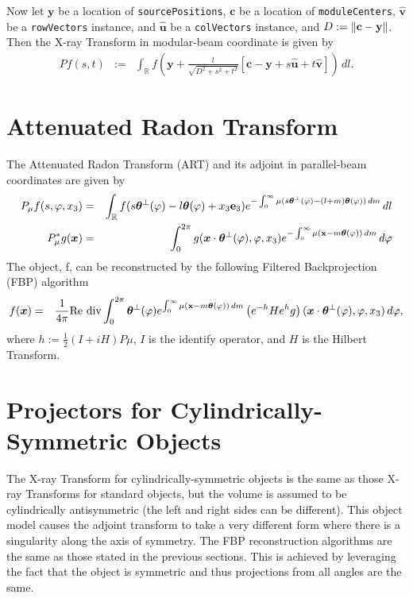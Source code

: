 \documentclass[11pt]{article}
\begin{document}
Now let $\bm{y}$ be a location of \texttt{sourcePositions}, $\bm{c}$ be a location of \texttt{moduleCenters}, $\bm{\widehat{v}}$ be a \texttt{rowVectors} instance, and $\bm{\widehat{u}}$ be a \texttt{colVectors} instance, and $D := \|\textbf{c}-\textbf{y}\|$. Then the X-ray Transform in modular-beam coordinate is given by
\begin{eqnarray*}
Pf(s,t) &:=& \int_{\mathbb{R}} f\left( \bm{y} + \frac{l}{\sqrt{D^2 + s^2 + t^2}}\left[ \bm{c}-\bm{y} + s\bm{\widehat{u}} + t\bm{\widehat{v}} \right] \right) \, dl.
\end{eqnarray*}


\section{Attenuated Radon Transform} \label{sec:ART}

The Attenuated Radon Transform (ART) and its adjoint in parallel-beam coordinates are given by
\begin{eqnarray*}
P_{\mu}f(s, \varphi, x_3) &=& \int_\mathbb{R} f(s\bm{\theta}^\perp(\varphi) - l\bm{\theta}(\varphi) + x_3\textbf{e}_3) e^{-\int_0^\infty \mu(s\bm{\theta}^\perp(\varphi) - (l+m)\bm{\theta}(\varphi)) \, dm} \, dl \\
P_{\mu}^*g(\bm{x}) &=& \int_0^{2\pi} g(\bm{x}\cdot\bm{\theta}^\perp(\varphi), \varphi, x_3) e^{-\int_0^\infty \mu(\textbf{x}-m\bm{\theta}(\varphi)) \, dm} \, d\varphi
\end{eqnarray*}
The object, f, can be reconstructed by the following Filtered Backprojection (FBP) algorithm
\begin{eqnarray*}
f(\bm{x}) &=& \frac{1}{4\pi} \text{Re div} \int_0^{2\pi} \bm{\theta}^\perp(\varphi) e^{\int_0^\infty \mu(\textbf{x}-m\bm{\theta}(\varphi)) \, dm} \left( e^{-h} H e^{h}g \right)(\bm{x}\cdot\bm{\theta}^\perp(\varphi), \varphi, x_3) \, d\varphi,
\end{eqnarray*}
where $h := \frac{1}{2}\left(I + iH\right) P\mu$, $I$ is the identify operator, and $H$ is the Hilbert Transform.

\section{Projectors for Cylindrically-Symmetric Objects}

The X-ray Transform for cylindrically-symmetric objects is the same as those X-ray Transforms for standard objects, but the volume is assumed to be cylindrically antisymmetric (the left and right sides can be different).  This object model causes the adjoint transform to take a very different form where there is a singularity along the axis of symmetry.  The FBP reconstruction algorithms are the same as those stated in the previous sections.  This is achieved by leveraging the fact that the object is symmetric and thus projections from all angles are the same.
\end{document}
